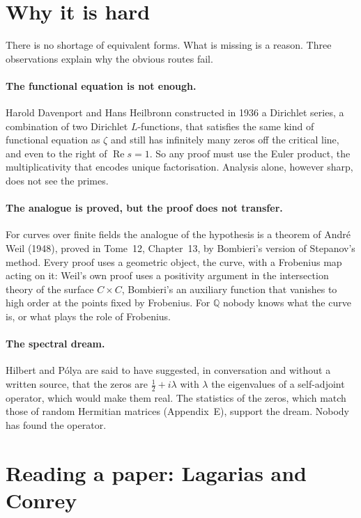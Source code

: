 \section{Why it is hard}

There is no shortage of equivalent forms. What is missing is a reason. Three observations explain why the obvious routes fail.

\paragraph{The functional equation is not enough.} Harold Davenport and Hans Heilbronn constructed in 1936 a Dirichlet series, a combination of two
Dirichlet $L$-functions, that satisfies the same kind of functional equation as $\zeta$ and still has infinitely many zeros off the critical line, and even
to the right of $\operatorname{Re}s=1$. So any proof must use the Euler product, the multiplicativity that encodes unique factorisation. Analysis alone,
however sharp, does not see the primes.

\paragraph{The analogue is proved, but the proof does not transfer.} For curves over finite fields the analogue of the hypothesis is a theorem of
Andr\'e Weil (1948), proved in Tome~12, Chapter~13, by Bombieri's version of Stepanov's method. Every proof uses a geometric object, the curve, with a
Frobenius map acting on it: Weil's own proof uses a positivity argument in the intersection theory of the surface $C\times C$, Bombieri's an auxiliary
function that vanishes to high order at the points fixed by Frobenius. For $\mathbb Q$ nobody knows what the curve is, or what plays the role of
Frobenius.

\paragraph{The spectral dream.} Hilbert and P\'olya are said to have suggested, in conversation and without a written source, that the zeros are
$\frac12+i\lambda$ with $\lambda$ the eigenvalues of a self-adjoint operator, which would make them real. The statistics of the zeros, which match
those of random Hermitian matrices (Appendix~E), support the dream. Nobody has found the operator.

\section{Reading a paper: Lagarias and Conrey}

